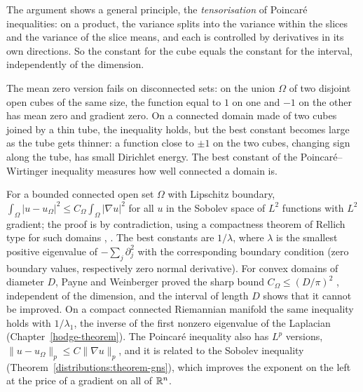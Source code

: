 The argument shows a general principle, the \emph{tensorisation} of Poincar\'e inequalities: on a product, the variance splits into the variance within the slices and the variance of the slice
means, and each is controlled by derivatives in its own directions. So the constant for the cube equals the constant for the interval, independently of the dimension.

\begin{counterexample}\label{distributions:counterexample-poincare-disconnected}
The mean zero version fails on disconnected sets: on the union $\Omega$ of two disjoint open cubes of the same size, the function equal to $1$ on one and $-1$ on the other has mean zero and gradient
zero. On a connected domain made of two cubes joined by a thin tube, the inequality holds, but the best constant becomes large as the tube gets thinner: a function close to $\pm1$ on the two
cubes, changing sign along the tube, has small Dirichlet energy. The best constant of the Poincar\'e--Wirtinger inequality measures how well connected a domain is.
\end{counterexample}

\begin{remark}\label{distributions:remark-poincare-general}
For a bounded connected open set $\Omega$ with Lipschitz boundary, $\int_\Omega|u - u_\Omega|^2 \leq C_\Omega\int_\Omega|\nabla u|^2$ for all $u$ in the Sobolev space of $L^2$ functions with $L^2$
gradient; the proof is by contradiction, using a compactness theorem of Rellich type for such domains \cite[Chapter 9]{brezis-functional}, \cite{evans-gariepy}. The best constants are $1/\lambda$,
where $\lambda$ is the smallest positive eigenvalue of $-\sum_j\partial_j^2$ with the corresponding boundary condition (zero boundary values, respectively zero normal derivative). For convex domains of
diameter $D$, Payne and Weinberger proved the sharp bound $C_\Omega \leq (D/\pi)^2$ \cite{payne-weinberger-1960}, independent of the dimension, and the interval of length $D$ shows that it cannot be
improved. On a compact connected Riemannian manifold the same inequality holds with $1/\lambda_1$, the inverse of the first nonzero eigenvalue of the Laplacian (Chapter~\ref{hodge-theorem}). The
Poincar\'e inequality also has $L^p$ versions, $\|u - u_\Omega\|_p \leq C\|\nabla u\|_p$, and it is related to the Sobolev inequality (Theorem~\ref{distributions:theorem-gns}), which improves the
exponent on the left at the price of a gradient on all of $\mathbb{R}^n$.
\end{remark}

